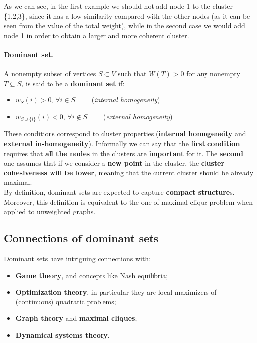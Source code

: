 As we can see, in the first example we should not add node 1 to the cluster \{1,2,3\}, since it has a low similarity compared with the other nodes (as it can be seen from the value of the total weight), while in the second case we would add node 1 in order to obtain a larger and more coherent cluster.

\paragraph{Dominant set.} A nonempty subset of vertices $S\subset V$ such that $W(T)>0$ for any nonempty $T \subseteq S$, is said to be a \textbf{dominant set} if:
\begin{itemize}
  \item $w_S(i) > 0$, $\forall i \in S \qquad$ (\textit{internal homogeneity})
  \item $w_{S \cup \{i\}}(i) < 0$, $\forall i \notin S \qquad$ (\textit{external homogeneity})
\end{itemize}
These conditions correspond to cluster properties (\textbf{internal homogeneity} and \textbf{external in-homogeneity}). Informally we can say that the \textbf{first condition} requires that \textbf{all the nodes} in the clusters are \textbf{important} for it. The \textbf{second} one assumes that if we consider a \textbf{new point} in the cluster, the \textbf{cluster cohesiveness will be lower}, meaning that the current cluster should be already maximal.\\
By definition, dominant sets are expected to capture \textbf{compact structure}s. Moreover, this definition is equivalent to the one of maximal clique problem when applied to unweighted graphs.


\subsection{Connections of dominant sets}
Dominant sets have intriguing connections with:

\begin{itemize}
    \item \textbf{Game theory}, and concepts like Nash equilibria;
    \item \textbf{Optimization theory}, in particular they are local maximizers of (continuous) quadratic problems;
    \item \textbf{Graph theory} and \textbf{maximal cliques};
    \item \textbf{Dynamical systems theory}.
\end{itemize}

